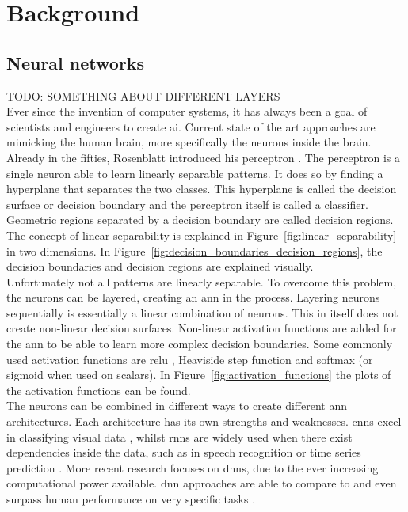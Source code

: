 \chapter{Background}
\section{Neural networks}
TODO: SOMETHING ABOUT DIFFERENT LAYERS\\

Ever since the invention of computer systems, it has always been a goal of scientists and engineers to create \gls{ai}. Current state of the art approaches are mimicking the human brain, more specifically the neurons inside the brain. Already in the fifties, Rosenblatt introduced his perceptron \cite{rosenblatt_perceptron_1958}. The perceptron is a single neuron able to learn linearly separable patterns. It does so by finding a hyperplane that separates the two classes. This hyperplane is called the decision surface or decision boundary and the perceptron itself is called a classifier. Geometric regions separated by a decision boundary are called decision regions. The concept of linear separability is explained in Figure~\ref{fig:linear_separability} in two dimensions. In Figure~\ref{fig:decision_boundaries_decision_regions}, the decision boundaries and decision regions are explained visually. \\

Unfortunately not all patterns are linearly separable. To overcome this problem, the neurons can be layered, creating an \gls{ann} in the process. Layering neurons sequentially is essentially a linear combination of neurons. This in itself does not create non-linear decision surfaces. Non-linear activation functions are added for the \gls{ann} to be able to learn more complex decision boundaries. Some commonly used activation functions are \gls{relu} \cite{relu}, Heaviside step function and softmax (or sigmoid when used on scalars). In Figure~\ref{fig:activation_functions} the plots of the activation functions can be found.\\ 

The neurons can be combined in different ways to create different \gls{ann} architectures. Each architecture has its own strengths and weaknesses. \glspl{cnn} excel in classifying visual data \cite{cnn_1, cnn_2}, whilst \glspl{rnn} are widely used when there exist dependencies inside the data, such as in speech recognition \cite{speech_1, speech_2} or time series prediction \cite{time_series_1}. More recent research focuses on \glspl{dnn}, due to the ever increasing computational power available. \gls{dnn} approaches are able to compare to and even surpass human performance on very specific tasks \cite{alpha_go_google, imagenet_dnn}.\\ 


